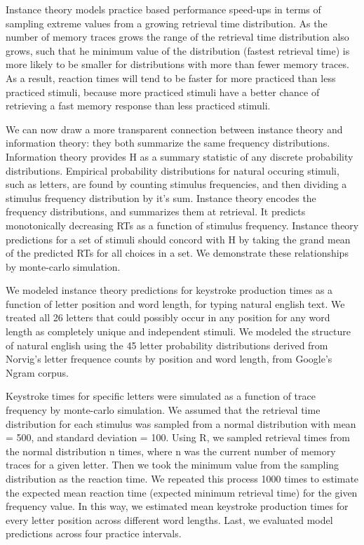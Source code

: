 \documentclass[floatsintext,man]{apa6}
\theoremstyle{definition}
\theoremstyle{definition}
\theoremstyle{definition}
\theoremstyle{remark}
\begin{document}
Instance theory models practice based performance speed-ups in terms of
sampling extreme values from a growing retrieval time distribution. As
the number of memory traces grows the range of the retrieval time
distribution also grows, such that he minimum value of the distribution
(fastest retrieval time) is more likely to be smaller for distributions
with more than fewer memory traces. As a result, reaction times will
tend to be faster for more practiced than less practiced stimuli,
because more practiced stimuli have a better chance of retrieving a fast
memory response than less practiced stimuli.

We can now draw a more transparent connection between instance theory
and information theory: they both summarize the same frequency
distributions. Information theory provides H as a summary statistic of
any discrete probability distributions. Empirical probability
distributions for natural occuring stimuli, such as letters, are found
by counting stimulus frequencies, and then dividing a stimulus frequency
distribution by it's sum. Instance theory encodes the frequency
distributions, and summarizes them at retrieval. It predicts
monotonically decreasing RTs as a function of stimulus frequency.
Instance theory predictions for a set of stimuli should concord with H
by taking the grand mean of the predicted RTs for all choices in a set.
We demonstrate these relationships by monte-carlo simulation.

We modeled instance theory predictions for keystroke production times as
a function of letter position and word length, for typing natural
english text. We treated all 26 letters that could possibly occur in any
position for any word length as completely unique and independent
stimuli. We modeled the structure of natural english using the 45 letter
probability distributions derived from Norvig's letter frequence counts
by position and word length, from Google's Ngram corpus.

Keystroke times for specific letters were simulated as a function of
trace frequency by monte-carlo simulation. We assumed that the retrieval
time distribution for each stimulus was sampled from a normal
distribution with mean = 500, and standard deviation = 100. Using R, we
sampled retrieval times from the normal distribution n times, where n
was the current number of memory traces for a given letter. Then we took
the minimum value from the sampling distribution as the reaction time.
We repeated this process 1000 times to estimate the expected mean
reaction time (expected minimum retrieval time) for the given frequency
value. In this way, we estimated mean keystroke production times for
every letter position across different word lengths. Last, we evaluated
model predictions across four practice intervals.
\end{document}

